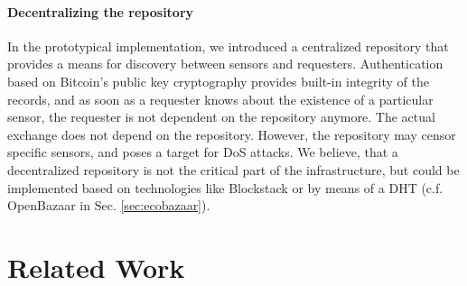 \paragraph{Decentralizing the repository}
In the prototypical implementation, we introduced a centralized repository that provides a means for discovery between sensors and requesters. Authentication based on Bitcoin's public key cryptography provides built-in integrity of the records, and as soon as a requester knows about the existence of a particular sensor, the requester is not dependent on the repository anymore. The actual exchange does not depend on the repository. However, the repository may censor specific sensors, and poses a target for \ac{DoS} attacks. We believe, that a decentralized repository is not the critical part of the infrastructure, but could be implemented based on technologies like Blockstack \parencite{ali2016blockstack} or by means of a \ac{DHT} (c.f. OpenBazaar in Sec. \ref{sec:ecobazaar}).

\section{Related Work}
\label{sec:s2aas_relatedwork}

